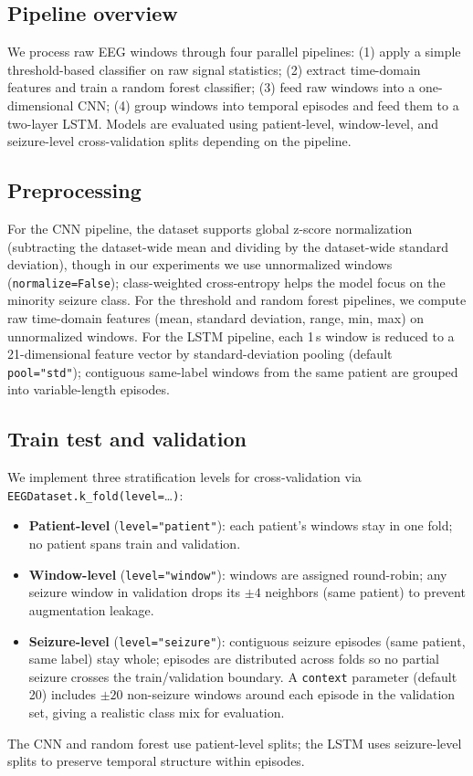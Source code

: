 \documentclass[11pt,a4paper]{article}
\begin{document}
\subsection{Pipeline overview}
We process raw EEG windows through four parallel pipelines: (1) apply a simple threshold-based classifier on raw signal statistics; (2) extract time-domain features and train a random forest classifier; (3) feed raw windows into a one-dimensional CNN; (4) group windows into temporal episodes and feed them to a two-layer LSTM.
Models are evaluated using patient-level, window-level, and seizure-level cross-validation splits depending on the pipeline.
\subsection{Preprocessing}
For the CNN pipeline, the dataset supports global z-score normalization (subtracting the dataset-wide mean and dividing by the dataset-wide standard deviation), though in our experiments we use unnormalized windows (\texttt{normalize=False}); class-weighted cross-entropy helps the model focus on the minority seizure class.
For the threshold and random forest pipelines, we compute raw time-domain features (mean, standard deviation, range, min, max) on unnormalized windows.
For the LSTM pipeline, each 1\,s window is reduced to a 21-dimensional feature vector by standard-deviation pooling (default \texttt{pool="std"}); contiguous same-label windows from the same patient are grouped into variable-length episodes.

\subsection{Train test and validation}
We implement three stratification levels for cross-validation via \texttt{EEGDataset.k\_fold(level=}\ldots\texttt{)}:
\begin{itemize}
\item \textbf{Patient-level} (\texttt{level="patient"}): each patient's windows stay in one fold; no patient spans train and validation.
\item \textbf{Window-level} (\texttt{level="window"}): windows are assigned round-robin; any seizure window in validation drops its $\pm 4$ neighbors (same patient) to prevent augmentation leakage.
\item \textbf{Seizure-level} (\texttt{level="seizure"}): contiguous seizure episodes (same patient, same label) stay whole; episodes are distributed across folds so no partial seizure crosses the train/validation boundary. A \texttt{context} parameter (default 20) includes $\pm20$ non-seizure windows around each episode in the validation set, giving a realistic class mix for evaluation.
\end{itemize}
The CNN and random forest use patient-level splits; the LSTM uses seizure-level splits to preserve temporal structure within episodes.
\end{document}
